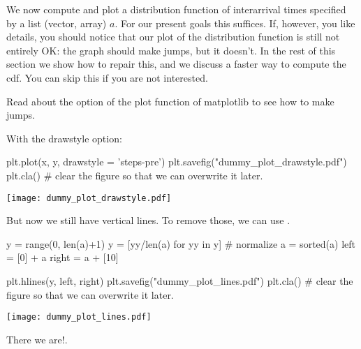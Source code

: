 \documentclass{scrartcl}
\begin{document}
We now compute and plot a distribution function of interarrival times specified by a list (vector, array) $a$. For our present goals this suffices. If, however, you like details, you should notice that our plot of the distribution function is still not entirely OK:  the graph should make  jumps, but it doesn't.  In the rest of this section we show how to repair this, and we discuss a faster way to compute the cdf. You can skip this if you are not interested. 

\begin{exercise}
Read about the  option of  the plot function of matplotlib to see how to make jumps.
  \begin{solution}
With the drawstyle option: 
\begin{pyblock}
plt.plot(x, y,  drawstyle = 'steps-pre')
plt.savefig("dummy_plot_drawstyle.pdf")
plt.cla() # clear the figure so that we can overwrite it later.
\end{pyblock}


\begin{center}
\texttt{[image: dummy\_plot\_drawstyle.pdf]}
\end{center}

But now we still have  vertical lines. To remove those, we can use .

\begin{pyblock}
y = range(0, len(a)+1)
y = [yy/len(a) for yy in y] # normalize
a = sorted(a)
left = [0] + a
right = a + [10]

plt.hlines(y, left, right)
plt.savefig("dummy_plot_lines.pdf")
plt.cla() # clear the figure so that we can overwrite it later.
\end{pyblock}

\begin{center}
\texttt{[image: dummy\_plot\_lines.pdf]}
\end{center}

There  we are!.
  \end{solution}
\end{exercise}
\end{document}
